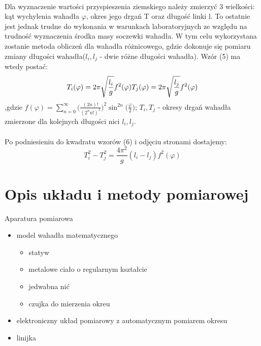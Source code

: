 \documentclass[a4paper,10pt]{article}
\begin{document}
\\Dla wyznaczenie wartości przyspieszenia ziemskiego należy zmierzyć 3 wielkości: kąt wychylenia wahadła $\varphi$, okres jego drgań T oraz długość linki l. To ostatnie jest jednak trudne do wykonania w warunkach laboratoryjnych ze względu na trudność wyznaczenia środka masy soczewki wahadła. W tym celu wykorzystana zostanie metoda obliczeń dla wahadła różnicowego, gdzie dokonuje się pomiaru zmiany długości wahadła($l_i, l_j$ - dwie różne długości wahadła). Wzór (5) ma wtedy postać:
\begin{equation}
T_i(\varphi) = 2\pi\sqrt{\frac{l_i}{g}}f^2(\varphi)\\\\\\
T_j(\varphi) = 2\pi\sqrt{\frac{l_j}{g}}f^2(\varphi)
\end{equation}
,gdzie $f(\varphi)=\sum_{n=0}^{\infty}\bigg(\frac{(2n)!}{(2^nn!)^2}\bigg)^2\sin^{2n}\bigg(\frac{\varphi}{2}\bigg)$; $T_i, T_j$ - okresy drgań wahadła zmierzone dla kolejnych długości nici $l_i, l_j$.
\\
\\Po podniesieniu do kwadratu wzorów (6) i odjęciu stronami dostajemy:
\begin{equation}
T_i^2-T_j^2 = \frac{4\pi^2}{g}(l_i-l_j)f^2(\varphi)
\end{equation}

\section{Opis układu i metody pomiarowej}
Aparatura pomiarowa
\begin{itemize}
  \item model wahadła matematycznego
\begin{itemize}
  \item statyw
  \item metalowe ciało o regularnym kształcie
  \item jedwabna nić
  \item czujka do mierzenia okreu
\end{itemize}
  \item elektroniczny układ pomiarowy z automatycznym pomiarem okresu
  \item linijka
\end{itemize}
 
\end{document}
